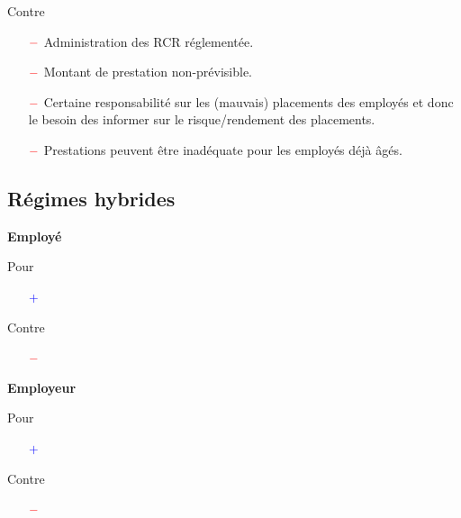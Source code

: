 \documentclass[10pt, french]{article}
\begin{document}
\begin{multicols*}{3}
Contre
\begin{itemize}
	\item[$\color{red}-$]	Administration des RCR réglementée.
	\item[$\color{red}-$]	Montant de prestation non-prévisible.
	\item[$\color{red}-$]	Certaine responsabilité sur les (mauvais) placements des employés et donc le besoin des informer sur le risque/rendement des placements.
	\item[$\color{red}-$]	Prestations peuvent être inadéquate pour les employés déjà âgés.
\end{itemize}

\subsection*{Régimes hybrides}
\begin{center}
	\textbf{Employé}
\end{center}
Pour
\begin{itemize}
	\item[$\color{blue}+$]	
\end{itemize}


Contre
\begin{itemize}
	\item[$\color{red}-$]	
\end{itemize}

\begin{center}
	\textbf{Employeur}
\end{center}
Pour
\begin{itemize}
	\item[$\color{blue}+$]	
\end{itemize}

Contre
\begin{itemize}
	\item[$\color{red}-$]	
\end{itemize}

\end{multicols*}
\end{document}
